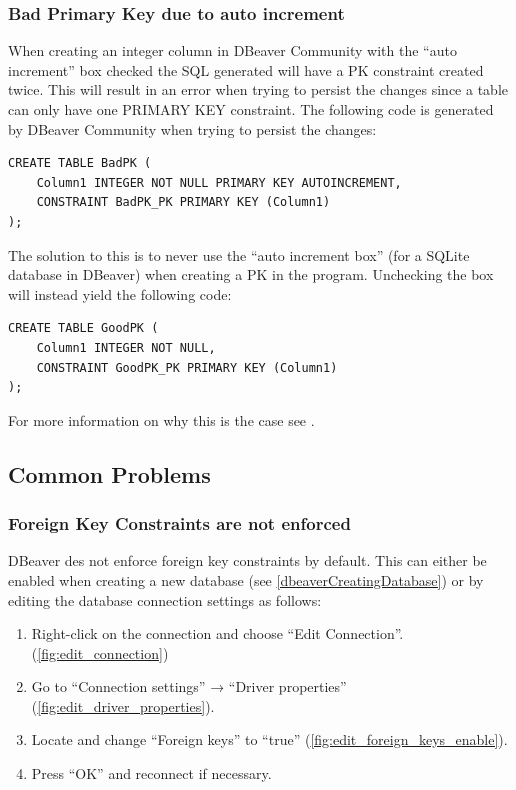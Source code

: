 \documentclass[a4paper,11pt,oneside]{article}
\begin{document}
\begin{sloppypar}
\subsubsection{Bad Primary Key due to auto increment}
When creating an integer column in DBeaver Community with the ``auto increment'' box checked the SQL generated will have a PK constraint created twice. This will result in an error when trying to persist the changes since a table can only have one PRIMARY KEY constraint. The following code is generated by DBeaver Community when trying to persist the changes:
\begin{lstlisting}[caption={Bad Primary Key due to auto increment in DBeaver}]
CREATE TABLE BadPK (
	Column1 INTEGER NOT NULL PRIMARY KEY AUTOINCREMENT,
	CONSTRAINT BadPK_PK PRIMARY KEY (Column1)
);
\end{lstlisting}
The solution to this is to never use the ``auto increment box'' (for a SQLite database in DBeaver) when creating a PK in the program. Unchecking the box will instead yield the following code:
\begin{lstlisting}[caption={Ok Primary Key in DBeaver if auto increment is unchecked}]
CREATE TABLE GoodPK (
	Column1 INTEGER NOT NULL,
	CONSTRAINT GoodPK_PK PRIMARY KEY (Column1)
);
\end{lstlisting}
For more information on why this is the case see \cite{dbeaver_issue_18491}.


\subsection{Common Problems}
\label{dbeaverCommonProblems}

\subsubsection{Foreign Key Constraints are not enforced}
\label{dbeaverForeignKeysNotEnforced}
DBeaver des not enforce foreign key constraints by default. This can either be enabled when creating a new database (see \autoref{dbeaverCreatingDatabase}) or by editing the database connection settings as follows:
\begin{enumerate}
    \item Right-click on the connection and choose ``Edit Connection''. (\autoref{fig:edit_connection})
    \item Go to ``Connection settings'' → ``Driver properties'' (\autoref{fig:edit_driver_properties}).
    \item Locate and change ``Foreign keys'' to ``true'' (\autoref{fig:edit_foreign_keys_enable}).
    \item Press ``OK'' and reconnect if necessary.
\end{enumerate}


\end{sloppypar}
\end{document}
